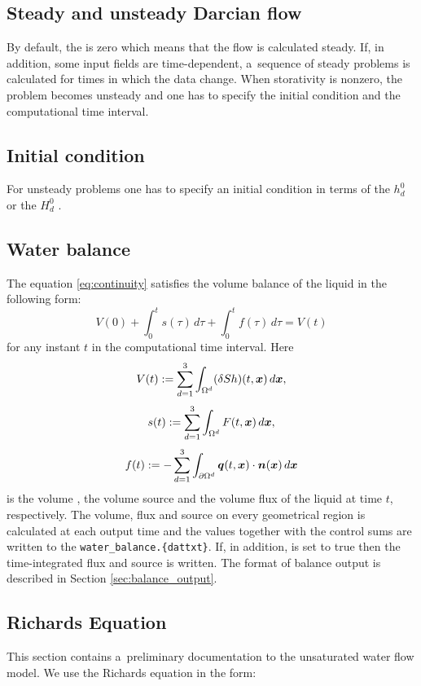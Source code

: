 \subsection{Steady and unsteady Darcian flow}

By default, the  is zero which means that the flow is calculated steady.
If, in addition, some input fields are time-dependent, a~sequence of steady problems is calculated for times in which the data change.
When storativity is nonzero, the problem becomes unsteady and one has to specify the initial condition and the computational time interval.

\subsection{Initial condition}
For unsteady problems one has to specify an initial condition in terms of the 
$h_d^0$ 
or the 
$H_d^0$ .

\subsection{Water balance}
The equation \eqref{eq:continuity} satisfies the volume balance of the liquid in the following form:
\[ V(0) + \int_0^t s(\tau) \,d\tau + \int_0^t f(\tau) \,d\tau = V(t) \]
for any instant $t$ in the computational time interval.
Here
$$ V(t) := \sum_{d=1}^3\int_{\Omega^d}(\delta S h)(t,\mathbf{\boldsymbol{x}})\,d\mathbf{\boldsymbol{x}}, $$
$$ s(t) := \sum_{d=1}^3\int_{\Omega^d}F(t,\mathbf{\boldsymbol{x}})\,d\mathbf{\boldsymbol{x}}, $$
$$ f(t) := -\sum_{d=1}^3\int_{\partial\Omega^d}\mathbf{\boldsymbol{q}}(t,\mathbf{\boldsymbol{x}})\cdot\mathbf{\boldsymbol{n}}(\mathbf{\boldsymbol{x}}) \,d\mathbf{\boldsymbol{x}} $$
is the volume , the volume source  and the volume flux  of the liquid at time $t$, respectively.
The volume, flux and source on every geometrical region is calculated at each output time and the values together with the control sums are written to the  \texttt{water\_balance.\{dat\textbar txt\}}.
If, in addition,  is set to true then the time-integrated flux and source is written.
The format of balance output is described in Section \ref{sec:balance_output}.

\subsection{Richards Equation}
This section contains a~preliminary documentation to the unsaturated water flow model. We use the Richards equation in the form:

